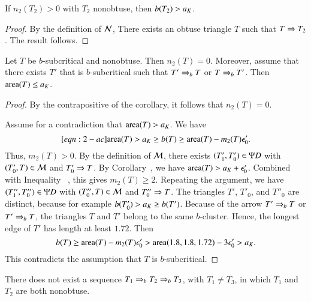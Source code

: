\begin{corollary}\label{lemma:n2b} If $n_2(T_2)>0$  with $T_2$ nonobtuse, then $b(T_2) > a_K$.
\end{corollary}  

\begin{proof}  By the definition of $\mathcal N$, There exists an obtuse triangle $T$ such that $T\Rightarrow T_2$.
The result follows.
\end{proof}

\begin{lemma}  Let $T$ be $b$-subcritical and nonobtuse.
Then $n_2(T)=0$.  Moreover, assume that there exists $T'$ that is $b$-subcritical
such that $T'\Rightarrow_{b} T$ or $T\Rightarrow_{b} T'$.  Then  ${\operatorname{area}}(T)\le a_K$.
\end{lemma}

\begin{proof}  
By the contrapositive of the corollary, it follows that $n_2(T)=0$.

Assume for a contradiction that ${\operatorname{area}}(T) > a_K$.
We have
\begin{equation}\libel{eqn:2-ac}
\area(T) > \aK \ge b(T) \ge \area(T) - m_2(T) \epso'.
\end{equation}
Thus, $m_2(T) >0$.  
By the definition of $\mathcal M$, there exists  $(T'_1,T'_0)\in\Psi D$ with $(T'_0,T)\in\mathcal M$ and $T'_0\Rightarrow T$.
By Corollary~, we have ${\operatorname{area}}(T) > a_K+\epsilon_0'$. Combined with
Inequality ~, this gives $m_2(T)\ge 2$.
Repeating the argument, we have $(T''_1,T''_0)\in \Psi D$ with $(T''_0,T)\in \mathcal M$ and $T''_0\Rightarrow T$.
The triangles $T'$, $T'_0$, and $T''_0$ are distinct, because for example $b(T'_0) > a_K \ge b(T')$.  
Because of the arrow $T'\Rightarrow_{b} T$ or $T'\Rightarrow_{b} T$, the triangles $T$ and $T'$ belong to the same $b$-cluster.
Hence, the longest edge of $T'$ has length at least $1.72$.
Then
\[
b(T) \ge {\operatorname{area}}(T) - m_2(T)\epsilon_0' > {\operatorname{area}}(1.8,1.8,1.72) - 3\epsilon_0' > a_K.
\]
This  contradicts the assumption that $T$ is $b$-subcritical.
\end{proof}

\begin{lemma} \label{lemma:rab-sequence} There does not exist a sequence
$T_1\Rightarrow_{b} T_2 \Rightarrow_{b} T_3$, with $T_1\ne T_3$, in which $T_1$ and $T_2$  are
both nonobtuse.
\end{lemma}

